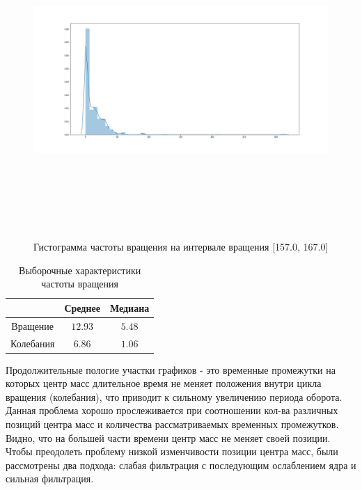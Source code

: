 \documentclass[a4paper,12pt]{article} %
\begin{document}
	\begin{figure}[H]		
		\includegraphics[width = 18cm, height = 12cm]{rot_hist.png}
		\caption{Гистограмма частоты вращения на интервале вращения [157.0, 167.0]}
		\label{fig:rot_hist}
	\end{figure}
	
	\begin{table}[H]
		\caption{Выборочные характеристики частоты вращения}
		\label{tab:my_label2}
		\begin{center}
			\vspace{5mm}
			\begin{tabular}{|c|c|c|}
				\hline
				& Среднее & Медиана\\
				\hline
				Вращение & $ 12.93 $ & $ 5.48 $\\
				\hline
				Колебания & $ 6.86 $ & $ 1.06 $\\
				\hline
			\end{tabular}
		\end{center}
	\end{table}
	
	Продолжительные пологие участки графиков - это временные промежутки на которых центр масс длительное время не меняет положения внутри цикла вращения (колебания), что приводит к сильному увеличению периода оборота. Данная проблема хорошо прослеживается при соотношении кол-ва различных позиций центра масс и количества рассматриваемых временных промежутков. Видно, что на большей части времени центр масс не меняет своей позиции.
	\newline Чтобы преодолеть проблему низкой изменчивости позиции центра масс, были рассмотрены два подхода: слабая фильтрация с последующим ослаблением ядра и сильная фильтрация.
	
\end{document}
